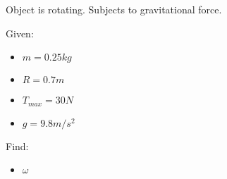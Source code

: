 

Object is rotating. Subjects to gravitational force.


\bigbreak Given: 
\begin{itemize}
    \item $  m  = 0.25kg $
    \item $ R = 0.7m $
    \item $ T_{max} = 30N $
    \item $ g = 9.8m/s^2 $
\end{itemize}


Find:

\begin{itemize}
    \item $ \omega $ 
\end{itemize}